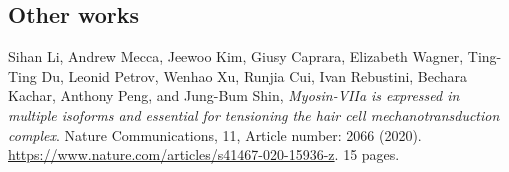 \subsection*{Other works}

\begin{etaremune}
	\renewcommand{\labelenumi}{[\theenumi]}
	\item
	Sihan Li, Andrew Mecca, Jeewoo Kim, Giusy Caprara, Elizabeth Wagner, Ting-Ting Du, Leonid Petrov, Wenhao Xu, Runjia Cui, Ivan Rebustini, Bechara Kachar, Anthony Peng, and Jung-Bum Shin,
	\emph{Myosin-VIIa is expressed in multiple isoforms and essential for tensioning the hair cell mechanotransduction complex}.
	Nature Communications, 11, Article number: 2066 (2020). \url{https://www.nature.com/articles/s41467-020-15936-z}. 15 pages.
\end{etaremune}

